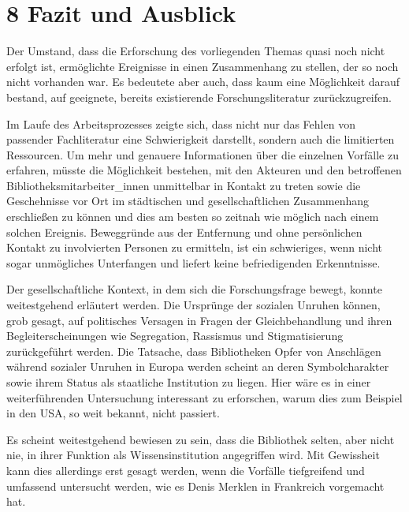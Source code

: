 \documentclass[a4paper,
fontsize=11pt,
oneside,
numbers=noperiodatend,
parskip=half-,
bibliography=totoc,
final
]{scrartcl}
\begin{document}
\hypertarget{fazit-und-ausblick}{%
\section{8 Fazit und Ausblick}\label{fazit-und-ausblick}}

Der Umstand, dass die Erforschung des vorliegenden Themas quasi noch
nicht erfolgt ist, ermöglichte Ereignisse in einen Zusammenhang zu
stellen, der so noch nicht vorhanden war. Es bedeutete aber auch, dass
kaum eine Möglichkeit darauf bestand, auf geeignete, bereits
existierende Forschungsliteratur zurückzugreifen.

Im Laufe des Arbeitsprozesses zeigte sich, dass nicht nur das Fehlen von
passender Fachliteratur eine Schwierigkeit darstellt, sondern auch die
limitierten Ressourcen. Um mehr und genauere Informationen über die
einzelnen Vorfälle zu erfahren, müsste die Möglichkeit bestehen, mit den
Akteuren und den betroffenen Bibliotheksmitarbeiter\_innen unmittelbar
in Kontakt zu treten sowie die Geschehnisse vor Ort im städtischen und
gesellschaftlichen Zusammenhang erschließen zu können und dies am besten
so zeitnah wie möglich nach einem solchen Ereignis. Beweggründe aus der
Entfernung und ohne persönlichen Kontakt zu involvierten Personen zu
ermitteln, ist ein schwieriges, wenn nicht sogar unmögliches Unterfangen
und liefert keine befriedigenden Erkenntnisse.

Der gesellschaftliche Kontext, in dem sich die Forschungsfrage bewegt,
konnte weitestgehend erläutert werden. Die Ursprünge der sozialen
Unruhen können, grob gesagt, auf politisches Versagen in Fragen der
Gleichbehandlung und ihren Begleiterscheinungen wie Segregation,
Rassismus und Stigmatisierung zurückgeführt werden. Die Tatsache, dass
Bibliotheken Opfer von Anschlägen während sozialer Unruhen in Europa
werden scheint an deren Symbolcharakter sowie ihrem Status als
staatliche Institution zu liegen. Hier wäre es in einer weiterführenden
Untersuchung interessant zu erforschen, warum dies zum Beispiel in den
USA, so weit bekannt, nicht passiert.

Es scheint weitestgehend bewiesen zu sein, dass die Bibliothek selten,
aber nicht nie, in ihrer Funktion als Wissensinstitution angegriffen
wird. Mit Gewissheit kann dies allerdings erst gesagt werden, wenn die
Vorfälle tiefgreifend und umfassend untersucht werden, wie es Denis
Merklen in Frankreich vorgemacht hat.
\end{document}
